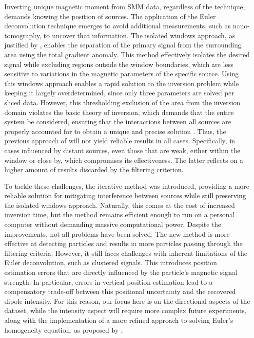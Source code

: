 Inverting unique magnetic moment from SMM data, regardless of the technique, demands knowing the position of sources. The application of the Euler deconvolution technique emerges to avoid additional measurements, such as nano-tomography, to uncover that information. The isolated windows approach, as justified by \cite{Souza-Junior2024}, enables the separation of the primary signal from the surrounding area using the total gradient anomaly. This method effectively isolates the desired signal while excluding regions outside the window boundaries, which are less sensitive to variations in the magnetic parameters of the specific source. Using this windows approach enables a rapid solution to the inversion problem while keeping it largely overdetermined, since only three parameters are solved per sliced data. However, this thresholding exclusion of the area from the inversion domain violates the basic theory of inversion, which demands that the entire system be considered, ensuring that the interactions between all sources are properly accounted for to obtain a unique and precise solution \citep{Baratchart2013, Lima2013}. Thus, the previous approach of \cite{Souza-Junior2024} will not yield reliable results in all cases. Specifically, in cases influenced by distant sources, even those that are weak, either within the window or close by, which compromises its effectiveness. The latter reflects on a higher amount of results discarded by the filtering criterion. 

To tackle these challenges, the iterative method was introduced, providing a more reliable solution for mitigating interference between sources while still preserving the isolated windows approach. Naturally, this comes at the cost of increased inversion time, but the method remains efficient enough to run on a personal computer without demanding massive computational power. Despite the improvements, not all problems have been solved. The new method is more effective at detecting particles and results in more particles passing through the filtering criteria. However, it still faces challenges with inherent limitations of the Euler deconvolution, such as clustered signals. This introduces position estimation errors that are directly influenced by the particle's magnetic signal strength. In particular, errors in vertical position estimation lead to a compensatory trade-off between this positional uncertainty and the recovered dipole intensity. For this reason, our focus here is on the directional aspects of the dataset, while the intensity aspect will require more complex future experiments, along with the implementation of a more refined approach to solving Euler's homogeneity equation, as proposed by \citet{Uieda2024}.

